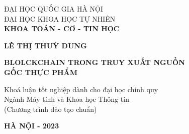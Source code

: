 \begin{titlepage}
    \thispagestyle{empty}
    \begin{center}        
        {\fontsize{14}{10}\selectfont 
        ĐẠI HỌC QUỐC GIA HÀ NỘI\\
        ĐẠI HỌC KHOA HỌC TỰ NHIÊN\\
        \fontsize{13}{16}\selectfont \textbf{KHOA TOÁN - CƠ - TIN HỌC}
        }
        \end{center}
        
        \vspace*{3cm}
        
        \begin{center}
            {
    
                \fontsize{14}{0}\selectfont \textbf{LÊ THỊ THUỲ DUNG}
            }
        \end{center}
        \begin{center}
       
        \vspace*{3cm}
        { 
            \fontsize{18}{24}\selectfont \textbf{ BLOLCKCHAIN TRONG TRUY XUẤT NGUỒN \\ GỐC THỰC PHẨM}}
        \end{center}
        \vspace*{2cm}
        \begin{center}
        {
        \fontsize{14}{16}\selectfont Khoá luận tốt nghiệp dành cho đại học chính quy \\
        \fontsize{14}{16}\selectfont Ngành Máy tính và Khoa học Thông tin \\
        (Chương trình đào tạo chuẩn)
        }
        \end{center}
        
        \vfill
         \centerline{
            \fontsize{14}{0}\selectfont \textbf{ HÀ NỘI - 2023}}
        
    \end{titlepage}
    
    